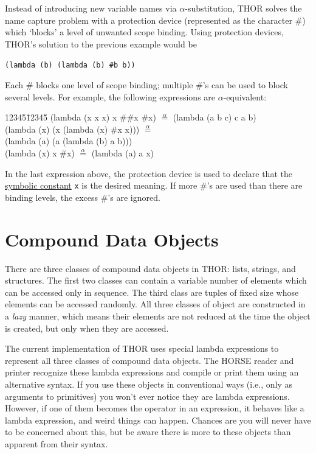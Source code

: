 	Instead of introducing new variable names via $\alpha$-substitution,
THOR solves the name capture problem with a protection device (represented as
the character \#) which `blocks' a level of unwanted scope binding. 
Using protection devices, THOR's solution to the previous example would
be 
\begin{center}
	{\mbox{\tt (lambda (b) (lambda (b) \#b b))}}
\end{center}
Each \# blocks one
level of scope binding;  multiple \#'s can be used to block several
levels.  For example, the following expressions are $\alpha$-equivalent:
\begin{tt}
\begin{tabbing}
12345\=12345\=\kill
\>	(lambda (x x x) x \#\#x \#x)  $\stackrel{\alpha}{=}$ 
		(lambda (a b c) c a b)\\
\>	(lambda (x) (x (lambda (x) \#x x))) $\stackrel{\alpha}{=}$ \\
\>\>		(lambda (a) (a (lambda (b) a b)))\\
\>	(lambda (x) x \#x) $\stackrel{\alpha}{=}$ 
		(lambda (a) a x)
\end{tabbing}
\end{tt}
In the last expression above,	the protection device is used to declare
that the \underline{symbolic constant} {\tt x} is the desired meaning.  If more \#'s are
used than there are binding levels, the excess \#'s are ignored.




\section{Compound Data Objects}

	There are three classes of compound data objects in THOR: lists, strings,
and structures.  The first two classes can contain a variable number of elements
which can be accessed only in sequence.  The third class are tuples of
fixed size whose elements can be accessed randomly.  All three 
classes of object are constructed in a {\em lazy} manner, which 
means their elements
are not reduced at the time the object is created, but only when they
are accessed.

	The  current implementation of THOR uses special lambda expressions
to represent all three classes of compound data objects.  The HORSE
reader and printer recognize these lambda expressions and compile or
print them using an alternative syntax.  If you use
these objects in conventional ways (i.e., only as arguments to
primitives) you won't ever notice they are lambda expressions.  However,
if one of them becomes the operator in an expression, it behaves like a
lambda expression, and weird things can happen.  Chances are you will
never have to be concerned about this, but be aware there is more to
these objects than apparent from their syntax.



